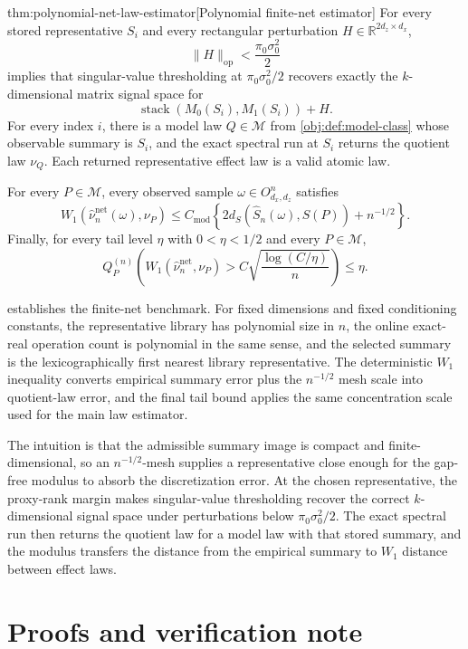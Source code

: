 \documentclass[11pt]{article}
\begin{document}
\begin{theoremv}{thm:polynomial-net-law-estimator}[Polynomial finite-net estimator]
For every stored representative \(S_i\) and every rectangular perturbation \(H\in\mathbb R^{2d_z\times d_x}\),
\[
\|H\|_{\mathrm{op}}<\frac{\pi_0\sigma_0^2}{2}
\]
implies that singular-value thresholding at \(\pi_0\sigma_0^2/2\) recovers exactly the \(k\)-dimensional matrix signal space for
\[
\operatorname{stack}(M_0(S_i),M_1(S_i))+H.
\]
For every index \(i\), there is a model law \(Q\in\mathcal M\) from \cref{obj:def:model-class} whose observable summary is \(S_i\), and the exact spectral run at \(S_i\) returns the quotient law \(\nu_Q\). Each returned representative effect law is a valid atomic law.

For every \(P\in\mathcal M\), every observed sample \(\omega\in O_{d_x,d_z}^n\) satisfies
\[
W_1\!\left(\widehat\nu_n^{\mathrm{net}}(\omega),\nu_P\right)
\le
C_{\mathrm{mod}}\left\{2d_S(\widehat S_n(\omega),S(P))+n^{-1/2}\right\}.
\]
Finally, for every tail level \(\eta\) with \(0<\eta<1/2\) and every \(P\in\mathcal M\),
\[
Q_P^{(n)}\!\left(
W_1\!\left(\widehat\nu_n^{\mathrm{net}},\nu_P\right)
>
C\sqrt{\frac{\log(C/\eta)}{n}}
\right)
\le \eta .
\]
\end{theoremv}

 establishes the finite-net benchmark. For fixed dimensions and fixed conditioning constants, the representative library has polynomial size in \(n\), the online exact-real operation count is polynomial in the same sense, and the selected summary is the lexicographically first nearest library representative. The deterministic \(W_1\) inequality converts empirical summary error plus the \(n^{-1/2}\) mesh scale into quotient-law error, and the final tail bound applies the same concentration scale used for the main law estimator.

The intuition is that the admissible summary image is compact and finite-dimensional, so an \(n^{-1/2}\)-mesh supplies a representative close enough for the gap-free modulus to absorb the discretization error. At the chosen representative, the proxy-rank margin makes singular-value thresholding recover the correct \(k\)-dimensional signal space under perturbations below \(\pi_0\sigma_0^2/2\). The exact spectral run then returns the quotient law for a model law with that stored summary, and the modulus transfers the distance from the empirical summary to \(W_1\) distance between effect laws.


\section{Proofs and verification note}
\end{document}
